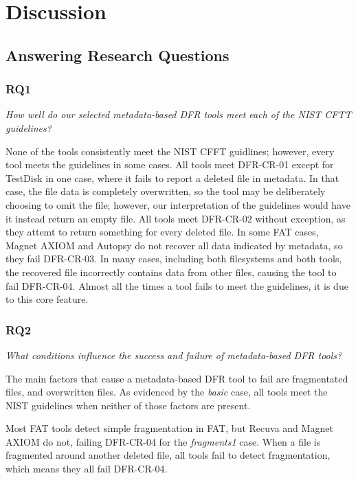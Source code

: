 \section{Discussion}

\subsection{Answering Research Questions}

\subsubsection{RQ1}
\emph{How well do our selected metadata-based DFR tools meet each of the NIST CFTT guidelines?}

None of the tools consistently meet the NIST CFFT guidlines; however, every tool meets the guidelines in some cases.
All tools meet DFR-CR-01 except for TestDisk in one case, where it fails to report a deleted file in metadata.
In that case, the file data is completely overwritten, so the tool may be deliberately choosing to omit the file; however, our interpretation of the guidelines would have it instead return an empty file.
All tools meet DFR-CR-02 without exception, as they attemt to return something for every deleted file.
In some FAT cases, Magnet AXIOM and Autopsy do not recover all data indicated by metadata, so they fail DFR-CR-03.
In many cases, including both filesystems and both tools, the recovered file incorrectly contains data from other files, causing the tool to fail DFR-CR-04.
Almost all the times a tool fails to meet the guidelines, it is due to this core feature.


\subsubsection{RQ2}
\emph{What conditions influence the success and failure of metadata-based DFR tools?}

The main factors that cause a metadata-based DFR tool to fail are fragmentated files, and overwritten files.
As evidenced by the \emph{basic} case, all tools meet the NIST guidelines when neither of those factors are present.

Most FAT tools detect simple fragmentation in FAT, but Recuva and Magnet AXIOM do not, failing DFR-CR-04 for the \emph{fragments1} case.
When a file is fragmented around another deleted file, all tools fail to detect fragmentation, which means they all fail DFR-CR-04.

